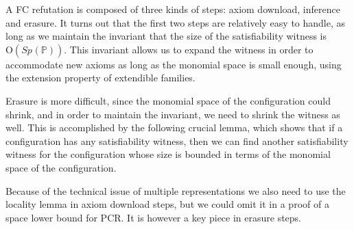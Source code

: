 \documentclass[11pt]{article}
\numberwithin{equation}{section}
\theoremstyle{definition}
\theoremstyle{plain}
\theoremstyle{plain}
\theoremstyle{definition}
\newcommand{\bigoh}[1]{\mathrm{O} ( #1 )}
\newcommand{\polynomialsetformat}[1]{\mathbb{#1}}
\newcommand{\pcsp}{\polynomialsetformat{P}}
\newcommand{\genericformsmall}[2]{\mathit{#1}( #2 )}
\newcommand{\mspaceof}[2][]{\genericformsmall{Sp_{#1}}{#2}}
\newcommand{\kextendibleNok}{extendible\xspace}
\newcommand{\extensionproperty}{extension property\xspace}
\begin{document}
A FC refutation is composed of three kinds of steps: axiom download, inference and erasure. It turns out that the first two steps are relatively easy to handle, as long as we maintain the invariant that the size of the satisfiability witness is $\bigoh{\mspaceof{\pcsp}}$. This invariant allows us to expand the witness in order to accommodate new axioms as long as the monomial space is small enough, using the \extensionproperty of \kextendibleNok families.

Erasure is more difficult, since the monomial space of the configuration could shrink, and in order to maintain the invariant, we need to shrink the witness as well. This is accomplished by the following crucial lemma, which shows that if a configuration has any satisfiability witness, then we can find another satisfiability witness for the configuration whose size is bounded in terms of the monomial space of the configuration.

Because of the technical issue of multiple representations we also need to use the locality lemma in axiom download steps, but we could omit it in a proof of a space lower bound for PCR. It is however a key piece in erasure steps.
\end{document}
